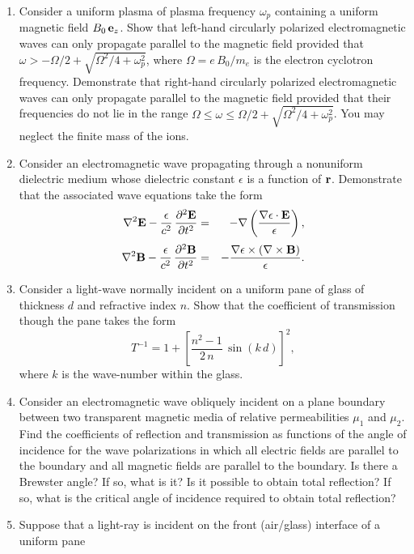 {\begin{enumerate}
frequencies. Demonstrate that the dispersion relation for
electromagnetic waves takes the form
$$
\omega^2 = k^2\,c^2+\omega_0^{\,2},
$$
where $\omega_0$ is a constant.
\item Consider a uniform plasma of plasma frequency $\omega_p$ containing a uniform magnetic field $B_0\,{\bf e}_z$. Show that left-hand
circularly polarized electromagnetic waves can only propagate parallel to the
magnetic field provided that $\omega > -\Omega/2 + \sqrt{\Omega^2/4+\omega_p^2}$, where $\Omega=e\,B_0/m_e$ is the electron cyclotron frequency.
Demonstrate that right-hand circularly polarized electromagnetic waves can only propagate
parallel to the magnetic field provided that their frequencies do
not lie in the range $\Omega\leq  \omega\leq\Omega/2 + \sqrt{\Omega^2/4+\omega_p^2}$. You may neglect the finite mass of the ions.
\item Consider an electromagnetic wave propagating through a
nonuniform dielectric medium whose dielectric constant $\epsilon$ is a
function of ${\bf r}$. Demonstrate that the associated
wave equations take the form
\begin{eqnarray}
\nabla^2{\bf E} - \frac{\epsilon}{c^2}\,\frac{\partial^2{\bf E}}{\partial t^2}
&=& - \nabla\left(\frac{\nabla\epsilon\cdot{\bf E}}{\epsilon}\right),\nonumber\\[0.5ex]
\nabla^2{\bf B} - \frac{\epsilon}{c^2}\,\frac{\partial^2{\bf B}}{\partial t^2}
&=& - \frac{\nabla\epsilon\times (\nabla\times {\bf B})}{\epsilon}.\nonumber
\end{eqnarray}
\item Consider a light-wave normally incident on a uniform
pane of glass of thickness $d$ and refractive index $n$. Show
that the coefficient of transmission though the pane takes the form
$$
T^{-1} = 1 + \left[\frac{n^2-1}{2\,n}\,\sin (k\,d)\right]^2,
$$
where $k$ is the wave-number within the glass.
\item Consider an electromagnetic wave obliquely incident on a plane
boundary between two transparent magnetic media of relative permeabilities 
$\mu_1$ and $\mu_2$. Find the coefficients of reflection and transmission
as functions of the angle of incidence for the wave polarizations in
which all electric fields are parallel to the boundary and all magnetic
fields are parallel to the boundary. Is there a Brewster angle? If so, what is it?
Is it possible to obtain total reflection? If so, what is the critical angle of
incidence required to obtain total reflection?
\item Suppose that a light-ray is incident on the front (air/glass) interface of a uniform pane

\end{enumerate}}
